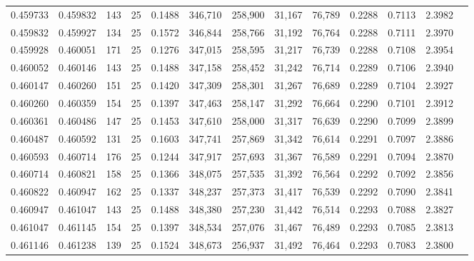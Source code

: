 \begin{tabular}{rrrrrrrrrrrrr}
0.459733 & 0.459832 &   143 &  25 &                                     0.1488 & 346,710 & 258,900 &  31,167 &  76,789 & 0.2288 & 0.7113 & 2.3982 \\
0.459832 & 0.459927 &   134 &  25 &                                     0.1572 & 346,844 & 258,766 &  31,192 &  76,764 & 0.2288 & 0.7111 & 2.3970 \\
0.459928 & 0.460051 &   171 &  25 &                                     0.1276 & 347,015 & 258,595 &  31,217 &  76,739 & 0.2288 & 0.7108 & 2.3954 \\
0.460052 & 0.460146 &   143 &  25 &                                     0.1488 & 347,158 & 258,452 &  31,242 &  76,714 & 0.2289 & 0.7106 & 2.3940 \\
0.460147 & 0.460260 &   151 &  25 &                                     0.1420 & 347,309 & 258,301 &  31,267 &  76,689 & 0.2289 & 0.7104 & 2.3927 \\
0.460260 & 0.460359 &   154 &  25 &                                     0.1397 & 347,463 & 258,147 &  31,292 &  76,664 & 0.2290 & 0.7101 & 2.3912 \\
0.460361 & 0.460486 &   147 &  25 &                                     0.1453 & 347,610 & 258,000 &  31,317 &  76,639 & 0.2290 & 0.7099 & 2.3899 \\
0.460487 & 0.460592 &   131 &  25 &                                     0.1603 & 347,741 & 257,869 &  31,342 &  76,614 & 0.2291 & 0.7097 & 2.3886 \\
0.460593 & 0.460714 &   176 &  25 &                                     0.1244 & 347,917 & 257,693 &  31,367 &  76,589 & 0.2291 & 0.7094 & 2.3870 \\
0.460714 & 0.460821 &   158 &  25 &                                     0.1366 & 348,075 & 257,535 &  31,392 &  76,564 & 0.2292 & 0.7092 & 2.3856 \\
0.460822 & 0.460947 &   162 &  25 &                                     0.1337 & 348,237 & 257,373 &  31,417 &  76,539 & 0.2292 & 0.7090 & 2.3841 \\
0.460947 & 0.461047 &   143 &  25 &                                     0.1488 & 348,380 & 257,230 &  31,442 &  76,514 & 0.2293 & 0.7088 & 2.3827 \\
0.461047 & 0.461145 &   154 &  25 &                                     0.1397 & 348,534 & 257,076 &  31,467 &  76,489 & 0.2293 & 0.7085 & 2.3813 \\
0.461146 & 0.461238 &   139 &  25 &                                     0.1524 & 348,673 & 256,937 &  31,492 &  76,464 & 0.2293 & 0.7083 & 2.3800 \\

\end{tabular}
